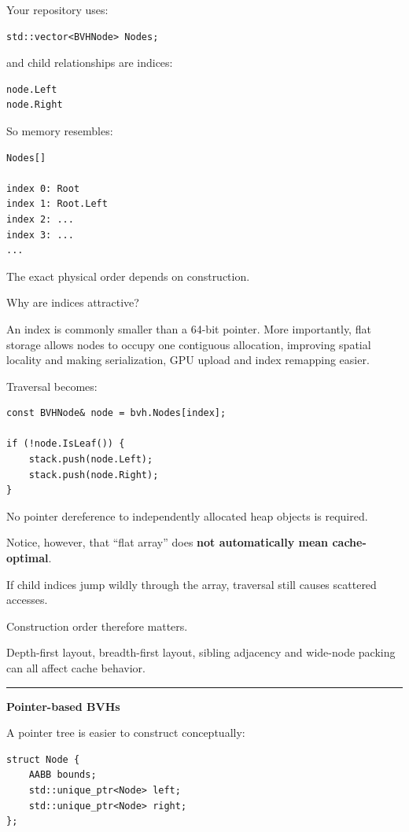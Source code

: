Your repository uses:

\begin{verbatim}
std::vector<BVHNode> Nodes;
\end{verbatim}

and child relationships are indices:

\begin{verbatim}
node.Left
node.Right
\end{verbatim}

So memory resembles:

\begin{verbatim}
Nodes[]

index 0: Root
index 1: Root.Left
index 2: ...
index 3: ...
...
\end{verbatim}

The exact physical order depends on construction.

Why are indices attractive?

An index is commonly smaller than a 64-bit pointer. More importantly, flat storage allows nodes to occupy one contiguous allocation, improving spatial locality and making serialization, GPU upload and index remapping easier.

Traversal becomes:

\begin{verbatim}
const BVHNode& node = bvh.Nodes[index];

if (!node.IsLeaf()) {
    stack.push(node.Left);
    stack.push(node.Right);
}
\end{verbatim}

No pointer dereference to independently allocated heap objects is required.

Notice, however, that ``flat array'' does \textbf{not automatically mean cache-optimal}.

If child indices jump wildly through the array, traversal still causes scattered accesses.

Construction order therefore matters.

Depth-first layout, breadth-first layout, sibling adjacency and wide-node packing can all affect cache behavior.

\begin{center}\rule{0.5\linewidth}{0.5pt}\end{center}

\textbf{Pointer-based BVHs}

A pointer tree is easier to construct conceptually:

\begin{verbatim}
struct Node {
    AABB bounds;
    std::unique_ptr<Node> left;
    std::unique_ptr<Node> right;
};
\end{verbatim}

